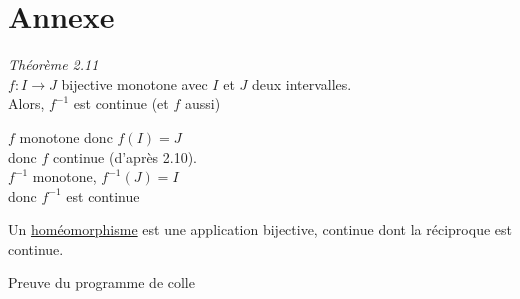 \part{Annexe}

\begin{thm}
	{\it Théorème 2.11}\\
	$f: I \to J$ bijective monotone avec $I$ et $J$ deux intervalles.\\
	Alors, $f^{-1}$ est continue (et $f$ aussi)
\end{thm}

\begin{prv}
	$f$ monotone donc $f(I) = J$\\
	donc $f$ continue (d'après 2.10).\\
	$f^{-1}$ monotone, $f^{-1}(J) = I$\\
	donc $f^{-1}$ est continue
\end{prv}

\begin{defn}
	Un \underline{homéomorphisme} est une application bijective, continue dont la réciproque est continue.
\end{defn}

\begin{rmk}
	Preuve du programme de colle
\end{rmk}

